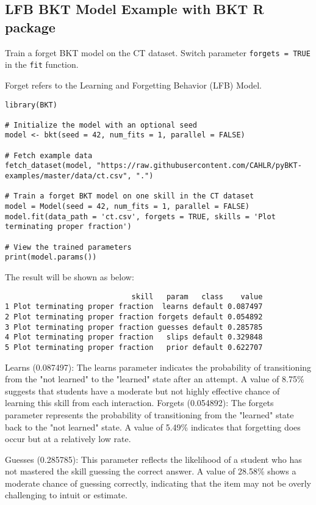 \documentclass{article}
\begin{document}
\subsection{LFB BKT Model Example with BKT R package}

Train a forget BKT model on the CT dataset. Switch parameter \texttt{forgets = TRUE} in the \texttt{fit} function. 

Forget refers to the Learning and Forgetting Behavior (LFB) Model.

\begin{lstlisting}[caption={R code to train a LFB BKT model}]
library(BKT)

# Initialize the model with an optional seed
model <- bkt(seed = 42, num_fits = 1, parallel = FALSE)

# Fetch example data
fetch_dataset(model, "https://raw.githubusercontent.com/CAHLR/pyBKT-examples/master/data/ct.csv", ".")

# Train a forget BKT model on one skill in the CT dataset
model = Model(seed = 42, num_fits = 1, parallel = FALSE)
model.fit(data_path = 'ct.csv', forgets = TRUE, skills = 'Plot terminating proper fraction')

# View the trained parameters
print(model.params())
\end{lstlisting}

The result will be shown as below:

\begin{verbatim}
                             skill   param   class    value
1 Plot terminating proper fraction  learns default 0.087497
2 Plot terminating proper fraction forgets default 0.054892
3 Plot terminating proper fraction guesses default 0.285785
4 Plot terminating proper fraction   slips default 0.329848
5 Plot terminating proper fraction   prior default 0.622707
\end{verbatim}

Learns (0.087497): The learns parameter indicates the probability of transitioning from the "not learned" to the "learned" state after an attempt. A value of 8.75\% suggests that students have a moderate but not highly effective chance of learning this skill from each interaction.
Forgets (0.054892): The forgets parameter represents the probability of transitioning from the "learned" state back to the "not learned" state. A value of 5.49\% indicates that forgetting does occur but at a relatively low rate.

Guesses (0.285785): This parameter reflects the likelihood of a student who has not mastered the skill guessing the correct answer. A value of 28.58\% shows a moderate chance of guessing correctly, indicating that the item may not be overly challenging to intuit or estimate.
\end{document}
